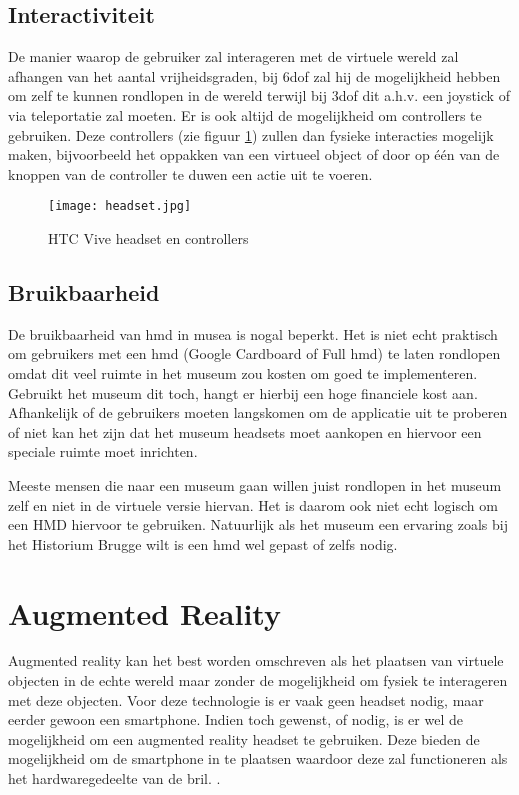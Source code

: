 \subsection{Interactiviteit}
De manier waarop de gebruiker zal interageren met de virtuele wereld zal afhangen van het aantal vrijheidsgraden, bij \acrshort{6dof} zal hij de mogelijkheid hebben om zelf te kunnen rondlopen in de wereld terwijl bij \acrshort{3dof} dit a.h.v. een joystick of via teleportatie zal moeten. Er is ook altijd de mogelijkheid om controllers te gebruiken. Deze controllers (zie figuur \ref{fig:htcvive}) zullen dan fysieke interacties mogelijk maken, bijvoorbeeld het oppakken van een virtueel object of door op één van de knoppen van de controller te duwen een actie uit te voeren.

\begin{figure}
    \texttt{[image: headset.jpg]}
    \caption{HTC Vive headset en controllers \autocite{Telegraph2018}}
    \label{fig:htcvive}
\end{figure}

\subsection{Bruikbaarheid}
De bruikbaarheid van \acrshort{hmd} in musea is nogal beperkt. Het is niet echt praktisch om gebruikers met een \acrshort{hmd} (Google Cardboard of Full \acrshort{hmd}) te laten rondlopen omdat dit veel ruimte in het museum zou kosten om goed te implementeren. Gebruikt het museum dit toch, hangt er hierbij een hoge financiele kost aan. Afhankelijk of de gebruikers moeten langskomen om de applicatie uit te proberen of niet kan het zijn dat het museum headsets moet aankopen en hiervoor een speciale ruimte moet inrichten.

Meeste mensen die naar een museum gaan willen juist rondlopen in het museum zelf en niet in de virtuele versie hiervan. Het is daarom ook niet echt logisch om een HMD hiervoor te gebruiken. Natuurlijk als het museum een ervaring zoals bij het Historium Brugge wilt is een \acrshort{hmd} wel gepast of zelfs nodig.

\section{Augmented Reality} \label{sec:augmentedreality}
Augmented reality kan het best worden omschreven als het plaatsen van virtuele objecten in de echte wereld maar zonder de mogelijkheid om fysiek te interageren met deze objecten. Voor deze technologie is er vaak geen headset nodig, maar eerder gewoon een smartphone. Indien toch gewenst, of nodig, is er wel de mogelijkheid om een augmented reality headset te gebruiken. Deze bieden de mogelijkheid om de smartphone in te plaatsen waardoor deze zal functioneren als het hardwaregedeelte van de bril. \autocite{Schops2014}.

